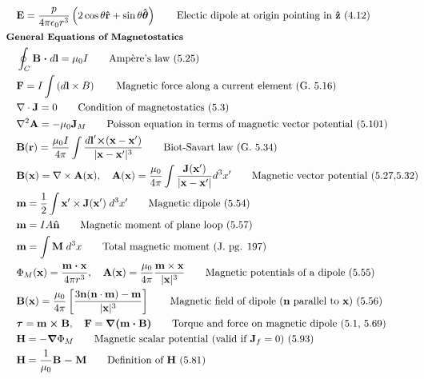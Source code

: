\documentclass[10pt]{article}
\newcommand{\rhat}{\boldsymbol{\hat{\textbf{r}}}}
\newcommand{\zhat}{\boldsymbol{\hat{\textbf{z}}}}
\newcommand{\nhat}{\boldsymbol{\hat{\textbf{n}}}}
\newcommand{\thetahat}{\boldsymbol{\hat{\textbf{$\theta$}}}}
\newcommand{\ve}[1]{\boldsymbol{\mathbf{#1}}}
\newcommand{\vect}[1]{\boldsymbol{\mathbf{#1}}}
\newcommand{\eo}{\epsilon_0}
\newcommand{\lrp}[1]{\left( #1 \right)}
\begin{document}
\begin{multicols}{2}
\begin{align*}
		& \ve{E} = \frac{p}{4 \pi \eo r^3}\lrp{2 \cos \theta \rhat + \sin \theta \thetahat} \tag*{Electic dipole at origin pointing in $\zhat$ (4.12)} \\	
	& \small \hspace{-10pt} \textbf{General Equations of Magnetostatics} \small \\
		& \oint_C \ve{B} \; \ve{\cdot} \; d \ve{l} = \mu_0 I \tag*{Amp\`ere's law (5.25)} \\
		& \ve{F} = I \int \lrp{d\ve{l} \times B}	\tag*{Magnetic force along a current element (G. 5.16)} \\
		& \nabla \cdot \vect{J} = 0 \tag*{Condition of magnetostatics (5.3)} \\
		& \nabla^2 \vect{A} = -\mu_0 \vect{J}_M \tag*{Poisson equation in terms of magnetic vector potential (5.101)} \\
		& \ve{B}(\ve{r}) = \frac{\mu_0 I}{4 \pi} \int \frac{d\ve{l}' \ve{\times} (\ve{x} - \ve{x}')}{|\ve{x} - \ve{x}'|^3} \tag*{Biot-Savart law (G. 5.34)} \\
		& \vect{B}(\vect{x}) = \nabla \times \vect{A}(\vect{x}), \quad \vect{A}(\vect{x}) = \frac{\mu_0}{4 \pi} \int \frac{\vect{J}(\vect{x}')}{|\vect{x}-\vect{x}'|} d^3 x' \tag*{Magnetic vector potential (5.27,5.32)} \\
		& \vect{m} = \frac{1}{2} \int \vect{x}' \times \vect{J}(\vect{x}') \; d^3 x'	\tag*{Magnetic dipole (5.54)} \\
		& \vect{m} = IA \nhat \tag*{Magnetic moment of plane loop (5.57)} \\
		& \ve{m} = \int \ve{M} \; d^3 x \tag*{Total magnetic moment (J. pg. 197)} \\
		& \Phi_M(\vect{x}) = \frac{\vect{m \cdot x}}{4 \pi r^3}, \quad \vect{A}(\vect{x}) = \frac{\mu_0}{4 \pi} \frac{\vect{m} \times \vect{x}}{|\vect{x}|^3} \tag*{Magnetic potentials of a dipole (5.55)} \\
		& \vect{B}(\vect{x}) = \frac{\mu_0}{4 \pi} \left[ \frac{3 \vect{n}(\vect{n} \cdot \vect{m}) - \vect{m}}{|\vect{x}|^3} \right]\tag*{Magnetic field of dipole ($\ve{n}$ parallel to $\ve{x}$) (5.56)}\\
		& \ve{\tau} = \ve{m \times B}, \quad \vect{F} = \vect{\nabla(m \cdot B)} \tag*{Torque and force on magnetic dipole (5.1, 5.69)} \\
		& \vect{H} = -\vect{\nabla} \Phi_M \tag*{Magnetic scalar potential (valid if $\ve{J}_f = 0$) (5.93)} \\
		& \vect{H} = \frac{1}{\mu_0} \vect{B - M} \tag*{Definition of $\ve{H}$ (5.81)} \\

\end{align*}
\end{multicols}
\end{document}
